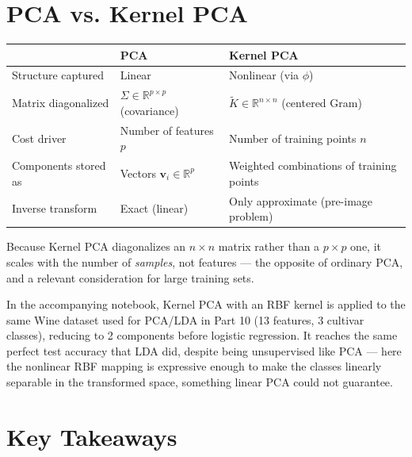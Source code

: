 \documentclass[11pt]{article}
\begin{document}
\section{PCA vs. Kernel PCA}

\begin{center}
\begin{tabular}{lll}
  \toprule
  & PCA & Kernel PCA \\
  \midrule
  Structure captured & Linear & Nonlinear (via $\phi$) \\
  Matrix diagonalized & $\Sigma \in \mathbb{R}^{p \times p}$ (covariance) & $\tilde{K} \in \mathbb{R}^{n \times n}$ (centered Gram) \\
  Cost driver & Number of features $p$ & Number of training points $n$ \\
  Components stored as & Vectors $\mathbf{v}_i \in \mathbb{R}^p$ & Weighted combinations of training points \\
  Inverse transform & Exact (linear) & Only approximate (pre-image problem) \\
  \bottomrule
\end{tabular}
\end{center}

Because Kernel PCA diagonalizes an $n \times n$ matrix rather than a
$p \times p$ one, it scales with the number of \emph{samples}, not
features --- the opposite of ordinary PCA, and a relevant consideration for
large training sets.

In the accompanying notebook, Kernel PCA with an RBF kernel is applied to
the same Wine dataset used for PCA/LDA in Part 10 (13 features, 3
cultivar classes), reducing to 2 components before logistic regression.
It reaches the same perfect test accuracy that LDA did, despite being
unsupervised like PCA --- here the nonlinear RBF mapping is expressive
enough to make the classes linearly separable in the transformed space,
something linear PCA could not guarantee.

\section{Key Takeaways}
\end{document}

